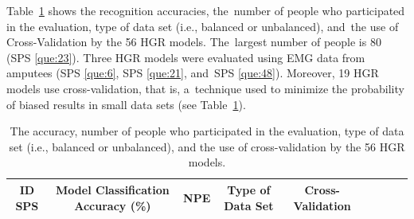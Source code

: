 \documentclass[sensors,review,accept,moreauthors,pdftex]{Definitions/mdpi}
\begin{document}
Table~\ref{tab:13} shows the recognition accuracies, the~number of people who participated in the evaluation, type of data set (i.e., balanced or unbalanced), and~the use of Cross-Validation by the 56 HGR models. The~largest number of people is 80 (SPS \ref{que:23}). Three HGR models were evaluated using EMG data from amputees (SPS \ref{que:6}, SPS \ref{que:21}, and~SPS \ref{que:48}). Moreover, 19 HGR models use cross-validation, that is, a~technique used to minimize the probability of biased results in small data sets (see Table~\ref{tab:13}). 

	

\begin{table}[H]
\centering
\caption{The accuracy, number of people who participated in the evaluation, type of data set (i.e., balanced or unbalanced), and the use of cross-validation by the 56 HGR models.} \label{tab:13}
\begin{tabular}{ccccccccc}
	\toprule
	
	
	\textbf{ID SPS}&\textbf{Model Classification Accuracy (\%)}&\textbf{NPE}&\textbf{Type of Data Set}&\textbf{Cross-Validation}\\
	
	\midrule
	
%	
%	
%	
%	
%	
				

\end{tabular}
\end{table}
\end{document}
